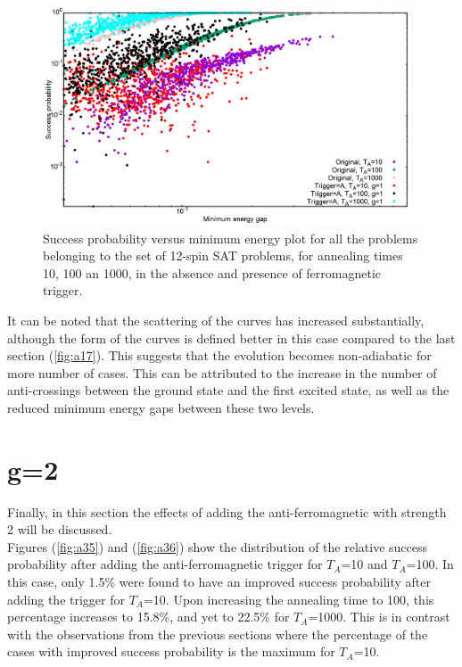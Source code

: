 \documentclass[../main.tex]{subfiles}
\begin{document}
\begin{figure}[H]
\centering 
\includegraphics[scale=0.3]{SuccVsGap_OA_g1.png}
\caption{Success probability versus minimum energy plot for all the problems belonging to the set of 12-spin SAT problems, for annealing times 10, 100 an 1000, in the absence and presence of ferromagnetic trigger.}
\label{fig:a34}
\end{figure}
It can be noted that the scattering of the curves has increased substantially, although the form of the curves is defined better in this case compared to the last section (\ref{fig:a17}). This suggests that the evolution becomes non-adiabatic for more number of cases. This can be attributed to the increase in the number of anti-crossings between the ground state and the first excited state, as well as the reduced minimum energy gaps between these two levels.


\section*{g=2}
Finally, in this section the effects of adding the anti-ferromagnetic with strength 2 will be discussed.\\
Figures (\ref{fig:a35}) and (\ref{fig:a36}) show the distribution of the relative success probability after adding the anti-ferromagnetic trigger for $T_A$=10 and $T_A$=100. In this case, only 1.5\% were found to have an improved success probability after adding the trigger for $T_A$=10. Upon increasing the annealing time to 100, this percentage increases to 15.8\%, and yet to 22.5\% for $T_A$=1000. This is in contrast with the observations from the previous sections where the percentage of the cases with improved success probability is the maximum for $T_A$=10. 
\end{document}
